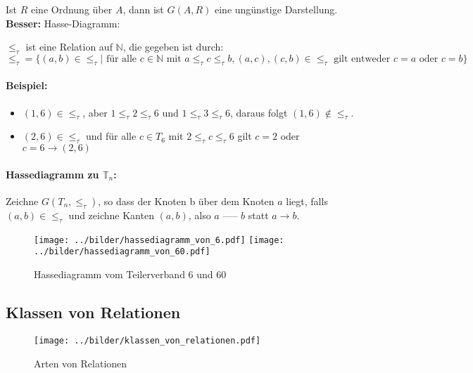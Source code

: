 \noindent Ist $R$ eine Ordnung über $A$, dann ist $G (A, R)$ eine ungünstige Darstellung. \\ {\bf Besser:} Hasse-Diagramm:

$\le_\tau$ ist eine Relation auf $\mathbb{N}$, die gegeben ist durch: \\
$ \le_\tau = \{ (a, b) \in \le_\tau | \text{ für alle } c \in \mathbb{N} \text{ mit } a \le_\tau c \le_\tau b, (a, c), (c, b) \in \le_\tau \text{ gilt entweder } c = a \text{ oder } c = b \}$

\paragraph{Beispiel:}
\begin{itemize}
\item $(1, 6) \in \le_\tau$, aber $1 \le_\tau 2 \le_\tau 6$ und
                                 $1 \le_\tau 3 \le_\tau 6$,
  daraus folgt $(1, 6) \not\in\le_\tau$.
 \item $(2, 6) \in \le_\tau$ und für alle $c \in T_6$ mit $2 \le_\tau c \le_\tau 6$ gilt $c = 2$ oder $c = 6 \rightarrow (2, 6)$
\end{itemize}

\paragraph{Hassediagramm zu $\mathbb{T}_n$:}

Zeichne $G (T_n, \le_\tau)$, so dass der Knoten b über dem Knoten $a$
liegt, falls $(a, b) \in \le_\tau$ und zeichne Kanten $(a, b)$, also
$a$ ----- $b$ statt $a \longrightarrow b$. \\

\begin{figure}[h]
  \texttt{[image: ../bilder/hassediagramm\_von\_6.pdf]}
  \texttt{[image: ../bilder/hassediagramm\_von\_60.pdf]}
  \caption{Hassediagramm vom Teilerverband 6 und 60}
\end{figure}

\subsection{Klassen von Relationen}

\begin{figure}[h]
  \texttt{[image: ../bilder/klassen\_von\_relationen.pdf]}
  \caption{Arten von Relationen}
\end{figure}

